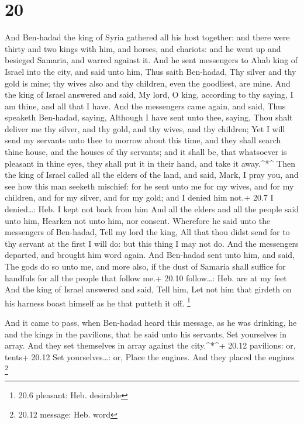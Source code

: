 \hypertarget{section-19}{%
\section{20}\label{section-19}}

 And Ben-hadad the king of Syria gathered all his host
together: and there were thirty and two kings with him, and horses, and
chariots: and he went up and besieged Samaria, and warred against it.
 And he sent messengers to Ahab king of Israel into the
city, and said unto him, Thus saith Ben-hadad,  Thy silver
and thy gold is mine; thy wives also and thy children, even the
goodliest, are mine.  And the king of Israel answered and
said, My lord, O king, according to thy saying, I am thine, and all that
I have.  And the messengers came again, and said, Thus
speaketh Ben-hadad, saying, Although I have sent unto thee, saying, Thou
shalt deliver me thy silver, and thy gold, and thy wives, and thy
children;  Yet I will send my servants unto thee to morrow
about this time, and they shall search thine house, and the houses of
thy servants; and it shall be, that whatsoever is pleasant in thine
eyes, they shall put it in their hand, and take it away.\^{}*\^{}
 Then the king of Israel called all the elders of the land,
and said, Mark, I pray you, and see how this man seeketh mischief: for
he sent unto me for my wives, and for my children, and for my silver,
and for my gold; and I denied him not.+ 20.7 I denied\ldots: Heb. I kept
not back from him  And all the elders and all the people
said unto him, Hearken not unto him, nor consent.  Wherefore
he said unto the messengers of Ben-hadad, Tell my lord the king, All
that thou didst send for to thy servant at the first I will do: but this
thing I may not do. And the messengers departed, and brought him word
again.  And Ben-hadad sent unto him, and said, The gods do
so unto me, and more also, if the dust of Samaria shall suffice for
handfuls for all the people that follow me.+ 20.10 follow\ldots: Heb.
are at my feet  And the king of Israel answered and said,
Tell him, Let not him that girdeth on his harness boast himself as he
that putteth it off. \footnote{20.6 pleasant: Heb. desirable}

 And it came to pass, when Ben-hadad heard this message, as
he was drinking, he and the kings in the pavilions, that he said unto
his servants, Set yourselves in array. And they set themselves in array
against the city.\^{}*\^{}+ 20.12 pavilions: or, tents+ 20.12 Set
yourselves\ldots: or, Place the engines. And they placed the engines
\footnote{20.12 message: Heb. word}

